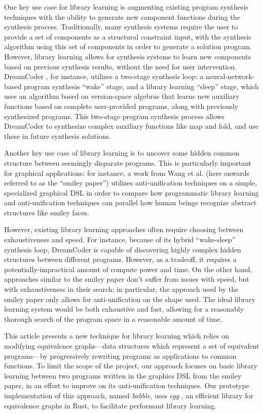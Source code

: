 \documentclass[acmsmall,nonacm]{acmart}\settopmatter{}
\begin{document}
One key use case for library learning is augmenting existing program synthesis techniques with the ability to generate new component functions during the synthesis process. Traditionally, many synthesis systems require the user to provide a set of components as a structural constraint input, with the synthesis algorithm using this set of components in order to generate a solution program. However, library learning allows for synthesis systems to learn new components based on previous synthesis results, without the need for user intervention. DreamCoder \cite{ellis_dreamcoder_nodate}, for instance, utilizes a two-stage synthesis loop: a neural-network-based program synthesis ``wake'' stage, and a library learning ``sleep'' stage, which uses an algorithm based on version-space algebras that learns new auxiliary functions based on complete user-provided programs, along with previously synthesized programs. This two-stage program synthesis process allows DreamCoder to synthesize complex auxiliary functions like map and fold, and use these in future synthesis solutions.

Another key use case of library learning is to uncover some hidden common structure between seemingly disparate programs. This is particularly important for graphical applications: for instance, a work from Wang et al. \cite{wang_learning_2021} (here onwards referred to as the ``smiley paper'') utilizes anti-unification techniques on a simple, specialized graphical DSL in order to compare how programmatic library learning and anti-unification techniques can parallel how human beings recognize abstract structures like smiley faces.

However, existing library learning approaches often require choosing between exhaustiveness and speed. For instance, because of its hybrid ``wake-sleep'' synthesis loop, DreamCoder is capable of discovering highly complex hidden structures between different programs. However, as a tradeoff, it requires a potentially-impractical amount of compute power and time. On the other hand, approaches similar to the smiley paper don't suffer from issues with speed, but with exhaustiveness in their search; in particular, the approach used by the smiley paper only allows for anti-unification on the shape used. The ideal library learning system would be both exhaustive and fast, allowing for a reasonably thorough search of the program space in a reasonable amount of time.

This article presents a new technique for library learning which relies on modifying equivalence graphs---data structures which represent a set of equivalent programs---by progressively rewriting programs as applications to common functions. To limit the scope of the project, our approach focuses on basic library learning between two programs written in the graphics DSL from the smiley paper, in an effort to improve on its anti-unification techniques. Our prototype implementation of this approach, named \textit{babble}, uses \textit{egg} \cite{willsey_egg_2021}, an efficient library for equivalence graphs in Rust, to facilitate performant library learning.
\end{document}
